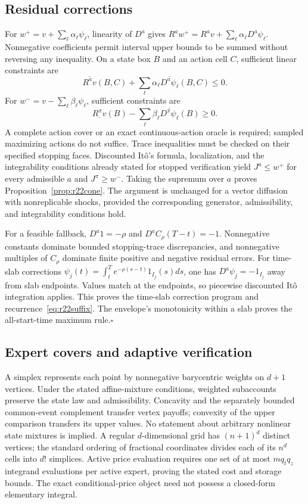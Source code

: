 \subsection{Residual corrections}
For $w^+=v+\sum_\ell\alpha_\ell\psi_\ell$, linearity of $D^a$ gives $R^aw^+=R^av+\sum_\ell\alpha_\ell D^a\psi_\ell$. Nonnegative coefficients permit interval upper bounds to be summed without reversing any inequality. On a state box $B$ and an action cell $C$, sufficient linear constraints are
\[
 \overline{R^av}(B,C)+\sum_\ell\alpha_\ell\overline{D^a\psi_\ell}(B,C)\leq0.
\]
For $w^-=v-\sum_\ell\beta_\ell\psi_\ell$, sufficient constraints are
\[
 \underline{R^\pi v}(B)-\sum_\ell\beta_\ell\overline{D^\pi\psi_\ell}(B)\geq0.
\]
A complete action cover or an exact continuous-action oracle is required; sampled maximizing actions do not suffice. Trace inequalities must be checked on their specified stopping faces. Discounted It\^o's formula, localization, and the integrability conditions already stated for stopped verification yield $J^a\leq w^+$ for every admissible $a$ and $J^\pi\geq w^-$. Taking the supremum over $a$ proves Proposition~\ref{prop:r22cone}. The argument is unchanged for a vector diffusion with nonreplicable shocks, provided the corresponding generator, admissibility, and integrability conditions hold.

For a feasible fallback, $D^a1=-\rho$ and $D^aC_\rho(T-t)=-1$. Nonnegative constants dominate bounded stopping-trace discrepancies, and nonnegative multiples of $C_\rho$ dominate finite positive and negative residual errors. For time-slab corrections $\psi_j(t)=\int_t^T e^{-\rho(s-t)}1_{I_j}(s)ds$, one has $D^a\psi_j=-1_{I_j}$ away from slab endpoints. Values match at the endpoints, so piecewise discounted It\^o integration applies. This proves the time-slab correction program and recurrence~\eqref{eq:r22suffix}. The envelope's monotonicity within a slab proves the all-start-time maximum rule.\hfill$\square$

\subsection{Expert covers and adaptive verification}
A simplex represents each point by nonnegative barycentric weights on $d+1$ vertices. Under the stated affine-mixture conditions, weighted subaccounts preserve the state law and admissibility. Concavity and the separately bounded common-event complement transfer vertex payoffs; convexity of the upper comparison transfers its upper values. No statement about arbitrary nonlinear state mixtures is implied. A regular $d$-dimensional grid has $(n+1)^d$ distinct vertices; the standard ordering of fractional coordinates divides each of its $n^d$ cells into $d!$ simplices. Active price evaluation requires one set of at most $mq_tq_z$ integrand evaluations per active expert, proving the stated cost and storage bounds. The exact conditional-price object need not possess a closed-form elementary integral.

